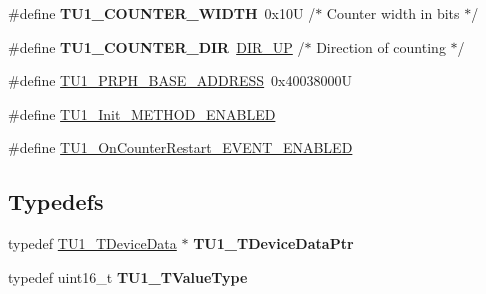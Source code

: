 \begin{DoxyCompactItemize}
\item 
\#define {\bfseries T\+U1\+\_\+\+C\+O\+U\+N\+T\+E\+R\+\_\+\+W\+I\+D\+TH}~0x10\+U       /$\ast$ Counter width in bits  $\ast$/\hypertarget{group___t_u1__module_ga1f7080987fb558b36a77447a61d7ec4a}{}\label{group___t_u1__module_ga1f7080987fb558b36a77447a61d7ec4a}

\item 
\#define {\bfseries T\+U1\+\_\+\+C\+O\+U\+N\+T\+E\+R\+\_\+\+D\+IR}~\hyperlink{group___p_e___types__module_gga89181fe4df1c4701239176768b4a9ce5a0b76fb863426c07c6c997a8d9523257b}{D\+I\+R\+\_\+\+UP}      /$\ast$ Direction of counting $\ast$/\hypertarget{group___t_u1__module_ga199a6b62d73e2782f77ac6c4f7a5ea41}{}\label{group___t_u1__module_ga199a6b62d73e2782f77ac6c4f7a5ea41}

\item 
\#define \hyperlink{group___t_u1__module_ga791d7a56f94f745b0dbb9a0ff09ee0d4}{T\+U1\+\_\+\+P\+R\+P\+H\+\_\+\+B\+A\+S\+E\+\_\+\+A\+D\+D\+R\+E\+SS}~0x40038000U
\item 
\#define \hyperlink{group___t_u1__module_ga2532ba47f579738a2f954e79d2d99e9d}{T\+U1\+\_\+\+Init\+\_\+\+M\+E\+T\+H\+O\+D\+\_\+\+E\+N\+A\+B\+L\+ED}
\item 
\#define \hyperlink{group___t_u1__module_ga776fe3d89696e57b98cf36b71dbcc86c}{T\+U1\+\_\+\+On\+Counter\+Restart\+\_\+\+E\+V\+E\+N\+T\+\_\+\+E\+N\+A\+B\+L\+ED}
\end{DoxyCompactItemize}
\subsection*{Typedefs}
\begin{DoxyCompactItemize}
\item 
typedef \hyperlink{struct_t_u1___t_device_data}{T\+U1\+\_\+\+T\+Device\+Data} $\ast$ {\bfseries T\+U1\+\_\+\+T\+Device\+Data\+Ptr}\hypertarget{group___t_u1__module_ga992897b60934aa5b8d6edb262c3bba55}{}\label{group___t_u1__module_ga992897b60934aa5b8d6edb262c3bba55}

\item 
typedef uint16\+\_\+t {\bfseries T\+U1\+\_\+\+T\+Value\+Type}\hypertarget{group___t_u1__module_ga10e196ba4fbf739bb461e1e9379ab405}{}\label{group___t_u1__module_ga10e196ba4fbf739bb461e1e9379ab405}

\end{DoxyCompactItemize}
